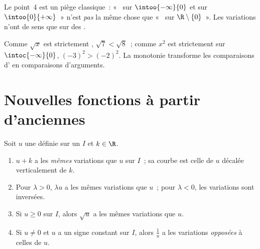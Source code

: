 \begin{remark}
Le point~4 est un piège classique~: «~ sur
$\intoo{-\infty}{0}$ et sur $\intoo{0}{+\infty}$~» n'est \emph{pas} la
même chose que «~ sur $\R \setminus \{0\}$~». Les variations
n'ont de sens que sur des .
\end{remark}

\begin{example}
Comme $\sqrt x$ est strictement , $\sqrt{7} < \sqrt{8}$~; comme
$x^2$ est strictement  sur $\intoc{-\infty}{0}$,
$(-3)^2 > (-2)^2$. La monotonie transforme les comparaisons d' en
comparaisons d'arguments.
\end{example}

\section{Nouvelles fonctions à partir d'anciennes}

\begin{proposition}[Transformations]\label{prop:g11:func:transforms}
Soit $u$ une  définie sur un  $I$ et $k \in \R$.
\begin{enumerate}
  \item $u + k$ a les \emph{mêmes} variations que $u$ sur $I$~; sa courbe
        est celle de $u$ décalée verticalement de $k$.
  \item Pour $\lambda > 0$, $\lambda u$ a les mêmes variations que $u$~;
        pour $\lambda < 0$, les variations sont inversées.
  \item Si $u \geq 0$ sur $I$, alors $\sqrt u$ a les mêmes variations que
        $u$.
  \item Si $u \neq 0$ et $u$ a un signe constant sur $I$, alors
        $\frac1u$ a les variations \emph{opposées} à celles de $u$.
\end{enumerate}
\end{proposition}

